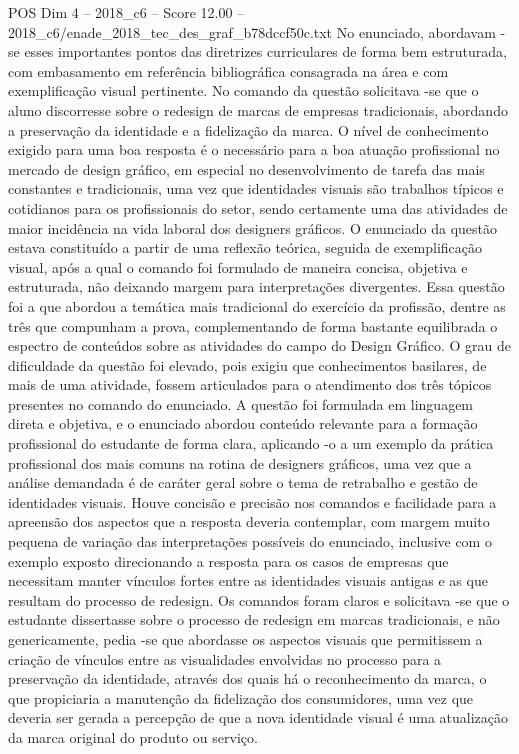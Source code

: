 \begin{textsample}{POS Dim 4 – 2018\_c6 – Score 12.00 – 2018\_c6/enade\_2018\_tec\_des\_graf\_b78dccf50c.txt}
No enunciado, abordavam -se esses importantes pontos das diretrizes curriculares de forma bem estruturada, com embasamento em referência bibliográfica consagrada na área e com exemplificação visual pertinente.
No comando da questão solicitava -se que o aluno discorresse sobre o redesign de marcas de empresas tradicionais, abordando a preservação da identidade e a fidelização da marca.
O nível de conhecimento exigido para uma boa resposta é o necessário para a boa atuação profissional no mercado de design gráfico, em especial no desenvolvimento de tarefa das mais constantes e tradicionais, uma vez que identidades visuais são trabalhos típicos e cotidianos para os profissionais do setor, sendo certamente uma das atividades de maior incidência na vida laboral dos designers gráficos.
O enunciado da questão estava constituído a partir de uma reflexão teórica, seguida de exemplificação visual, após a qual o comando foi formulado de maneira concisa, objetiva e estruturada, não deixando margem para interpretações divergentes.
Essa questão foi a que abordou a temática mais tradicional do exercício da profissão, dentre as três que compunham a prova, complementando de forma bastante equilibrada o espectro de conteúdos sobre as atividades do campo do Design Gráfico.
O grau de dificuldade da questão foi elevado, pois exigiu que conhecimentos basilares, de mais de uma atividade, fossem articulados para o atendimento dos três tópicos presentes no comando do enunciado.
A questão foi formulada em linguagem direta e objetiva, e o enunciado abordou conteúdo relevante para a formação profissional do estudante de forma clara, aplicando -o a um exemplo da prática profissional dos mais comuns na rotina de designers gráficos, uma vez que a análise demandada é de caráter geral sobre o tema de retrabalho e gestão de identidades visuais.
Houve concisão e precisão nos comandos e facilidade para a apreensão dos aspectos que a resposta deveria contemplar, com margem muito pequena de variação das interpretações possíveis do enunciado, inclusive com o exemplo exposto direcionando a resposta para os casos de empresas que necessitam manter vínculos fortes entre as identidades visuais antigas e as que resultam do processo de redesign.
Os comandos foram claros e solicitava -se que o estudante dissertasse sobre o processo de redesign em marcas tradicionais, e não genericamente, pedia -se que abordasse os aspectos visuais que permitissem a criação de vínculos entre as visualidades envolvidas no processo para a preservação da identidade, através dos quais há o reconhecimento da marca, o que propiciaria a manutenção da fidelização dos consumidores, uma vez que deveria ser gerada a percepção de que a nova identidade visual é uma atualização da marca original do produto ou serviço.

\end{textsample}
